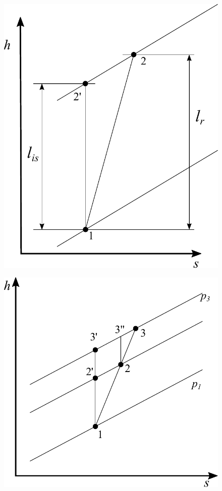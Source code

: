\begin{figure}[h!]
\centering
\begin{minipage}{.45\textwidth}
  \centering
  \includegraphics[width=.9\linewidth]{fig/Rend1.pdf}
  \label{fig:Rend1}
\end{minipage}%
\begin{minipage}{.55\textwidth}
  \centering
  \includegraphics[width=.9\linewidth]{fig/Rend2.pdf}
  \label{fig:Rend2}
\end{minipage}
\end{figure}

